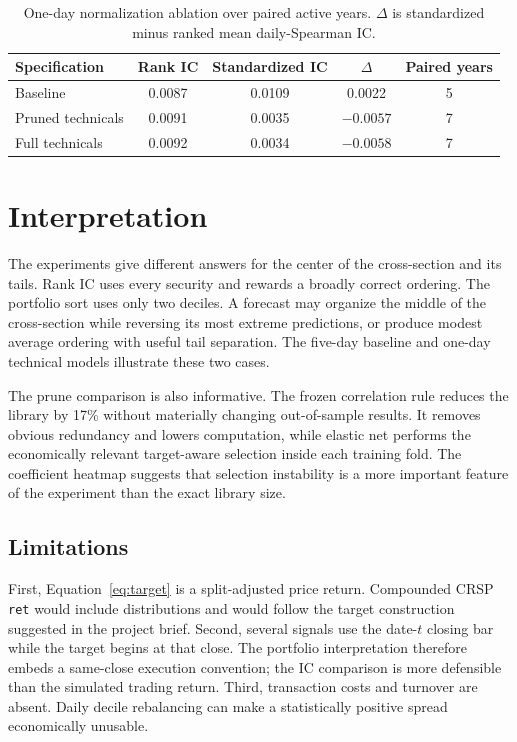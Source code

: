 \documentclass[11pt]{article}
\begin{document}
\begin{table}[ht]
\centering
\caption{One-day normalization ablation over paired active years.
$\Delta$ is standardized minus ranked mean daily-Spearman IC.}
\label{tab:normalization}
\small
\begin{tabular}{@{}lcccc@{}}
\toprule
Specification & Rank IC & Standardized IC & $\Delta$ & Paired years \\
\midrule
Baseline & 0.0087 & 0.0109 & 0.0022 & 5 \\
Pruned technicals & 0.0091 & 0.0035 & $-0.0057$ & 7 \\
Full technicals & 0.0092 & 0.0034 & $-0.0058$ & 7 \\
\bottomrule
\end{tabular}
\end{table}

\FloatBarrier
\section{Interpretation}

The experiments give different answers for the center of the cross-section
and its tails. Rank IC uses every security and rewards a broadly correct
ordering. The portfolio sort uses only two deciles. A forecast may organize
the middle of the cross-section while reversing its most extreme predictions,
or produce modest average ordering with useful tail separation. The
five-day baseline and one-day technical models illustrate these two cases.

The prune comparison is also informative. The frozen correlation rule reduces
the library by 17\% without materially changing out-of-sample results. It
removes obvious redundancy and lowers computation, while elastic net performs
the economically relevant target-aware selection inside each training fold.
The coefficient heatmap suggests that selection instability is a more
important feature of the experiment than the exact library size.

\subsection{Limitations}
\label{sec:limitations}

First, Equation~\eqref{eq:target} is a split-adjusted price return. Compounded
CRSP \texttt{ret} would include distributions and would follow the target
construction suggested in the project brief. Second, several signals use the
date-$t$ closing bar while the target begins at that close. The portfolio
interpretation therefore embeds a same-close execution convention; the IC
comparison is more defensible than the simulated trading return. Third,
transaction costs and turnover are absent. Daily decile rebalancing can make
a statistically positive spread economically unusable.
\end{document}

